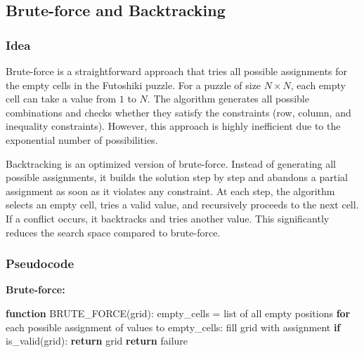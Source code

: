 \subsection{Brute-force and Backtracking}

\subsubsection{Idea}
Brute-force is a straightforward approach that tries all possible assignments for the empty cells in the Futoshiki puzzle. For a puzzle of size $N \times N$, each empty cell can take a value from $1$ to $N$. The algorithm generates all possible combinations and checks whether they satisfy the constraints (row, column, and inequality constraints). However, this approach is highly inefficient due to the exponential number of possibilities.

Backtracking is an optimized version of brute-force. Instead of generating all possible assignments, it builds the solution step by step and abandons a partial assignment as soon as it violates any constraint. At each step, the algorithm selects an empty cell, tries a valid value, and recursively proceeds to the next cell. If a conflict occurs, it backtracks and tries another value. This significantly reduces the search space compared to brute-force.

\subsubsection{Pseudocode}
\textbf{Brute-force:}
\begin{algorithm}[H]
\caption{Brute-force}
\begin{algorithmic}[1]
\State \textbf{function} BRUTE\_FORCE(grid):
\State \hspace{1.5em} empty\_cells = list of all empty positions
\State \hspace{1.5em} \textbf{for} each possible assignment of values to empty\_cells:
\State \hspace{3em} fill grid with assignment
\State \hspace{3em} \textbf{if} is\_valid(grid):
\State \hspace{4.5em} \textbf{return} grid
\State \hspace{1.5em} \textbf{return} failure
\end{algorithmic}
\end{algorithm}

